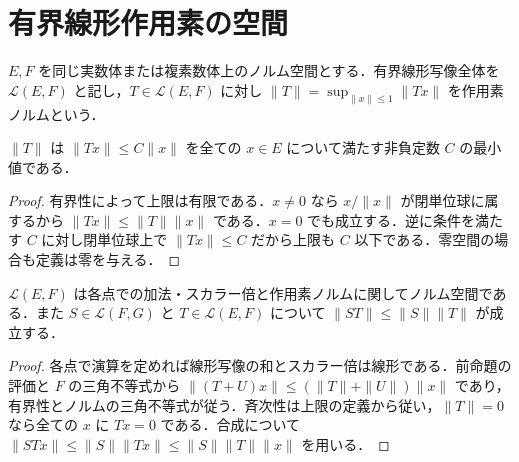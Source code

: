 \section{有界線形作用素の空間}
\begin{defn}[作用素ノルム]
$E,F$ を同じ実数体または複素数体上のノルム空間とする．有界線形写像全体を $\mathcal L(E,F)$ と記し，$T\in\mathcal L(E,F)$ に対し $\|T\|=\sup_{\|x\|\leq1}\|Tx\|$ を作用素ノルムという．
\end{defn}
\begin{prop}[作用素ノルムの評価]
$\|T\|$ は $\|Tx\|\leq C\|x\|$ を全ての $x\in E$ について満たす非負定数 $C$ の最小値である．
\end{prop}
\begin{proof}
有界性によって上限は有限である．$x\ne0$ なら $x/\|x\|$ が閉単位球に属するから $\|Tx\|\leq\|T\|\|x\|$ である．$x=0$ でも成立する．逆に条件を満たす $C$ に対し閉単位球上で $\|Tx\|\leq C$ だから上限も $C$ 以下である．零空間の場合も定義は零を与える．
\end{proof}
\begin{prop}[有界線形写像のノルム空間]
$\mathcal L(E,F)$ は各点での加法・スカラー倍と作用素ノルムに関してノルム空間である．また $S\in\mathcal L(F,G)$ と $T\in\mathcal L(E,F)$ について $\|ST\|\leq\|S\|\|T\|$ が成立する．
\end{prop}
\begin{proof}
各点で演算を定めれば線形写像の和とスカラー倍は線形である．前命題の評価と $F$ の三角不等式から $\|(T+U)x\|\leq(\|T\|+\|U\|)\|x\|$ であり，有界性とノルムの三角不等式が従う．斉次性は上限の定義から従い，$\|T\|=0$ なら全ての $x$ に $Tx=0$ である．合成について $\|STx\|\leq\|S\|\|Tx\|\leq\|S\|\|T\|\|x\|$ を用いる．
\end{proof}

